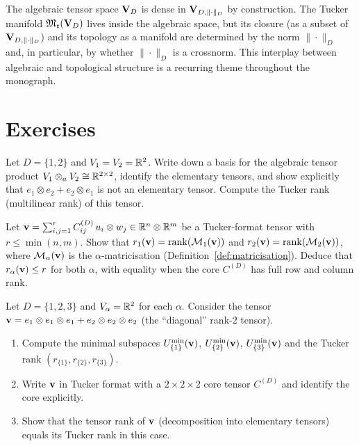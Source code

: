 \begin{remark}
\label{rem:algebraic_dense}
The algebraic tensor space $\mathbf{V}_D$ is dense in $\mathbf{V}_{D,\|\cdot\|_D}$ by construction.
The Tucker manifold $\mathfrak{M}_{\mathfrak{r}}(\mathbf{V}_D)$ lives inside the algebraic space,
but its closure (as a subset of $\mathbf{V}_{D,\|\cdot\|_D}$) and its topology as a manifold
are determined by the norm $\|\cdot\|_D$ and, in particular, by whether
$\|\cdot\|_D$ is a crossnorm. This interplay between algebraic and
topological structure is a recurring theme throughout the monograph.
\end{remark}

\section{Exercises}
\label{sec:algtensor:exercises}

\begin{exercise}
Let $D = \{1,2\}$ and $V_1 = V_2 = \mathbb{R}^2$. Write down a basis for the
algebraic tensor product $V_1 \otimes_a V_2 \cong \mathbb{R}^{2\times 2}$,
identify the elementary tensors, and show explicitly that
$e_1 \otimes e_2 + e_2 \otimes e_1$ is not an elementary tensor.
Compute the Tucker rank (multilinear rank) of this tensor.
\end{exercise}

\begin{exercise}
Let $\mathbf{v} = \sum_{i,j=1}^r C^{(D)}_{ij}\, u_i \otimes w_j \in
\mathbb{R}^n \otimes \mathbb{R}^m$ be a Tucker-format tensor with $r \leq \min(n,m)$.
Show that $r_1(\mathbf{v}) = \mathrm{rank}(\mathcal{M}_{1}(\mathbf{v}))$ and
$r_2(\mathbf{v}) = \mathrm{rank}(\mathcal{M}_{2}(\mathbf{v}))$, where $\mathcal{M}_{\alpha}(\mathbf{v})$
is the $\alpha$-matricisation (Definition~\ref{def:matricisation}).
Deduce that $r_\alpha(\mathbf{v}) \leq r$ for both $\alpha$, with equality
when the core $C^{(D)}$ has full row and column rank.
\end{exercise}

\begin{exercise}
Let $D = \{1,2,3\}$ and $V_\alpha = \mathbb{R}^2$ for each $\alpha$.
Consider the tensor $\mathbf{v} = e_1 \otimes e_1 \otimes e_1 + e_2 \otimes
e_2 \otimes e_2$ (the ``diagonal'' rank-2 tensor).
\begin{enumerate}
\item[\textup{(a)}] Compute the minimal subspaces
    $U^{\min}_{\{1\}}(\mathbf{v})$, $U^{\min}_{\{2\}}(\mathbf{v})$, $U^{\min}_{\{3\}}(\mathbf{v})$
    and the Tucker rank $(r_{\{1\}}, r_{\{2\}}, r_{\{3\}})$.
\item[\textup{(b)}] Write $\mathbf{v}$ in Tucker format with a $2 \times 2
    \times 2$ core tensor $C^{(D)}$ and identify the core explicitly.
\item[\textup{(c)}] Show that the tensor rank of $\mathbf{v}$ (decomposition
    into elementary tensors) equals its Tucker rank in this case.
\end{enumerate}
\end{exercise}

